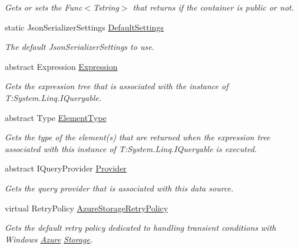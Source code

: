 \begin{DoxyCompactItemize}
\begin{DoxyCompactList}\small\item\em Gets or sets the Func$<$\+Tstring$>$ that returns if the container is public or not. \end{DoxyCompactList}\item 
static Json\+Serializer\+Settings \hyperlink{classCqrs_1_1Azure_1_1BlobStorage_1_1StorageStore_ac5c27123fd0bf4d926a4865e2d6b0bdd_ac5c27123fd0bf4d926a4865e2d6b0bdd}{Default\+Settings}
\begin{DoxyCompactList}\small\item\em The default Json\+Serializer\+Settings to use. \end{DoxyCompactList}\item 
abstract Expression \hyperlink{classCqrs_1_1Azure_1_1BlobStorage_1_1StorageStore_a21c204b514718b8af550ce2a627c4b70_a21c204b514718b8af550ce2a627c4b70}{Expression}
\begin{DoxyCompactList}\small\item\em Gets the expression tree that is associated with the instance of T\+:\+System.\+Linq.\+I\+Queryable. \end{DoxyCompactList}\item 
abstract Type \hyperlink{classCqrs_1_1Azure_1_1BlobStorage_1_1StorageStore_af298920154f31a7d0117facbb2f7cd54_af298920154f31a7d0117facbb2f7cd54}{Element\+Type}
\begin{DoxyCompactList}\small\item\em Gets the type of the element(s) that are returned when the expression tree associated with this instance of T\+:\+System.\+Linq.\+I\+Queryable is executed. \end{DoxyCompactList}\item 
abstract I\+Query\+Provider \hyperlink{classCqrs_1_1Azure_1_1BlobStorage_1_1StorageStore_a3cc5fd841fb449ca365d05a52e8e8438_a3cc5fd841fb449ca365d05a52e8e8438}{Provider}
\begin{DoxyCompactList}\small\item\em Gets the query provider that is associated with this data source. \end{DoxyCompactList}\item 
virtual Retry\+Policy \hyperlink{classCqrs_1_1Azure_1_1BlobStorage_1_1StorageStore_ad16f8d276c7570c95979b39098d1216b_ad16f8d276c7570c95979b39098d1216b}{Azure\+Storage\+Retry\+Policy}
\begin{DoxyCompactList}\small\item\em Gets the default retry policy dedicated to handling transient conditions with Windows \hyperlink{namespaceCqrs_1_1Azure}{Azure} \hyperlink{namespaceCqrs_1_1Azure_1_1Storage}{Storage}. \end{DoxyCompactList}\end{DoxyCompactItemize}


